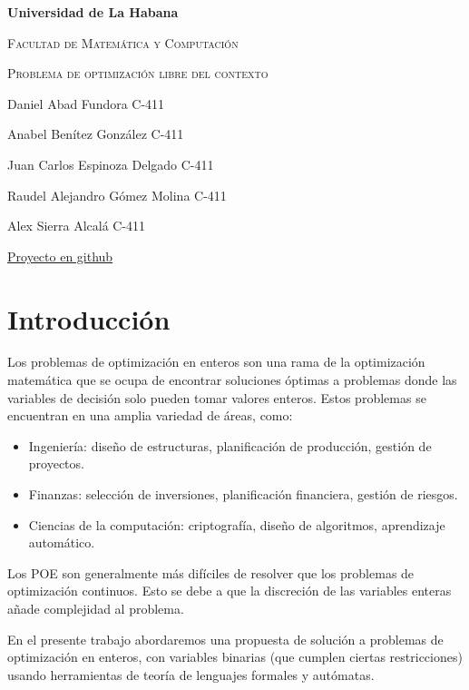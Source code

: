 \documentclass{article}
\begin{document}
\begin{titlepage}
    \centering
    {\bfseries\LARGE Universidad de La Habana \par}
    \vspace{1cm}
    {\scshape\Large Facultad de Matemática y Computación \par}
    \vspace{3cm}
    {\scshape\Huge Problema de optimización libre del contexto \par}
    \vfill

    {\Large Daniel Abad Fundora C-411 \par}
    {\Large Anabel Benítez González C-411 \par}
    {\Large Juan Carlos Espinoza Delgado C-411 \par}
    {\Large Raudel Alejandro Gómez Molina C-411 \par}
    {\Large Alex Sierra Alcalá C-411 \par}
    \vfill
    {\href{https://github.com/ARJ-Code/MMA-Project}{Proyecto en github} \par}
\end{titlepage}



\section*{Introducción}
Los problemas de optimización en enteros son una rama de la optimización matemática que se ocupa de encontrar soluciones óptimas a problemas 
donde las variables de decisión solo pueden tomar valores enteros. Estos problemas se encuentran en una amplia variedad de áreas, como:

\begin{itemize}
    \item Ingeniería: diseño de estructuras, planificación de producción, gestión de proyectos.
    \item Finanzas: selección de inversiones, planificación financiera, gestión de riesgos.
    \item Ciencias de la computación: criptografía, diseño de algoritmos, aprendizaje automático.
\end{itemize}

Los POE son generalmente más difíciles de resolver que los problemas de optimización continuos. 
Esto se debe a que la discreción de las variables enteras añade complejidad al problema.

En el presente trabajo abordaremos una propuesta de solución a problemas de optimización en enteros, con variables binarias (que cumplen ciertas restricciones) usando
herramientas de teoría de lenguajes formales y autómatas.
\end{document}
